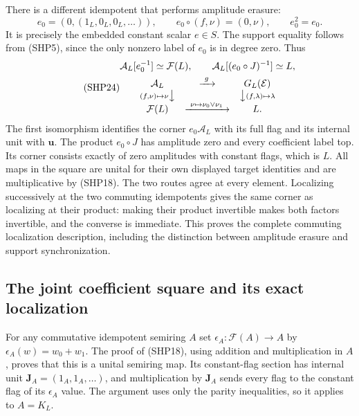 There is a different idempotent that performs amplitude
erasure:
\begin{equation}\tag{SHP23}
 e_0=(0,(1_L,0_L,0_L,\ldots)),\qquad
 e_0\circ(f,\nu)=(0,\nu),\qquad e_0^2=e_0.
\end{equation}
It is precisely the embedded constant scalar $e\in S$.
The support equality follows from (SHP5), since the
only nonzero label of $e_0$ is in degree zero.
Thus
\begin{equation}\tag{SHP24}
 \begin{gathered}
 \mathcal A_L[e_0^{-1}]\simeq\mathcal F(L),\qquad
 \mathcal A_L[(e_0\circ J)^{-1}]\simeq L,\\
 \begin{array}{ccc}
 \mathcal A_L&\xrightarrow{\ g\ }&G_L(\mathcal E)\\
 {\scriptstyle(f,\nu)\mapsto\nu}\big\downarrow
 &&\big\downarrow{\scriptstyle(f,\lambda)\mapsto\lambda}\\
 \mathcal F(L)&\xrightarrow{\ \nu\mapsto\nu_0\vee\nu_1\ }&L .
 \end{array}
 \end{gathered}
\end{equation}
The first isomorphism identifies the corner $e_0\mathcal A_L$
with its full flag and its internal unit with $\mathbf u$.
The product $e_0\circ J$ has amplitude zero and every
coefficient label top. Its corner consists exactly of
zero amplitudes with constant flags, which is $L$.
All maps in the square are unital for their own
displayed target identities and are multiplicative
by (SHP18).
The two routes agree at every element. Localizing
successively at the two commuting idempotents gives
the same corner as localizing at their product:
making their product invertible makes both factors
invertible, and the converse is immediate.
This proves the complete commuting localization
description, including the distinction between
amplitude erasure and support synchronization.

\subsection{The joint coefficient square and its exact localization}

For any commutative idempotent semiring $A$ set
$\epsilon_A:\mathcal F(A)\to A$ by
$\epsilon_A(w)=w_0+w_1$.
The proof of (SHP18), using addition and multiplication
in $A$, proves that this is a unital semiring map.
Its constant-flag section has internal unit
$\mathbf J_A=(1_A,1_A,\ldots)$, and multiplication
by $\mathbf J_A$ sends every flag to the constant
flag of its $\epsilon_A$ value.
The argument uses only the parity inequalities,
so it applies to $A=K_L$.


